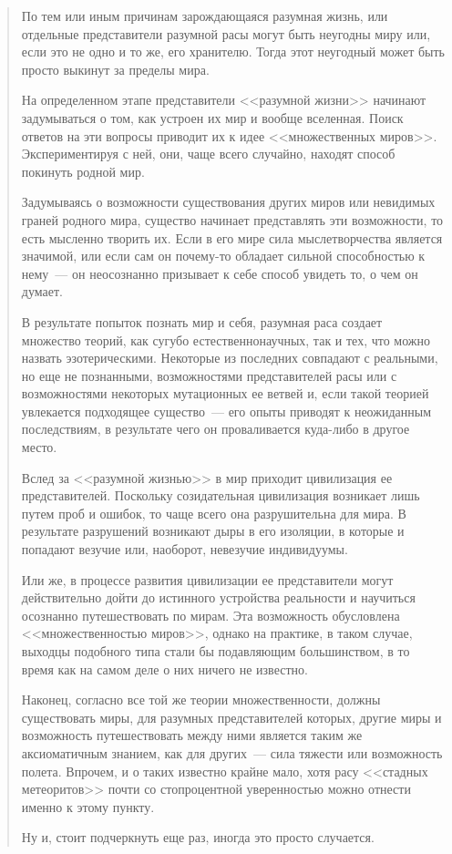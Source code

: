 \begin{quote}
По тем или иным причинам зарождающаяся разумная жизнь, или отдельные 
представители разумной расы могут быть неугодны миру или, если это не одно и то 
же, его хранителю. Тогда этот неугодный может быть просто выкинут за пределы 
мира.

На определенном этапе представители <<разумной жизни>> начинают задумываться о 
том, как устроен их мир и вообще вселенная. Поиск ответов на эти вопросы 
приводит их к идее <<множественных миров>>. Экспериментируя с ней, они, чаще 
всего 
случайно, находят способ покинуть родной мир.

Задумываясь о возможности существования других миров или невидимых граней 
родного мира, существо начинает представлять эти возможности, то есть мысленно 
творить их. Если в его мире сила мыслетворчества является значимой, или если 
сам 
он почему-то обладает сильной способностью к нему~--- он неосознанно призывает 
к 
себе способ увидеть то, о чем он думает.

В результате попыток познать мир и себя, разумная раса создает множество 
теорий, 
как сугубо естественнонаучных, так и тех, что можно назвать эзотерическими. 
Некоторые из последних совпадают с реальными, но еще не познанными, 
возможностями представителей расы или с возможностями некоторых мутационных ее 
ветвей и, если такой теорией увлекается подходящее существо~--- его опыты 
приводят 
к неожиданным последствиям, в результате чего он проваливается куда-либо в 
другое место.

Вслед за <<разумной жизнью>> в мир приходит цивилизация ее представителей. 
Поскольку созидательная цивилизация возникает лишь путем проб и ошибок, то чаще 
всего она разрушительна для мира. В результате разрушений возникают дыры в его 
изоляции, в которые и попадают везучие или, наоборот, невезучие индивидуумы.

Или же, в процессе развития цивилизации ее представители могут действительно 
дойти до истинного устройства реальности и научиться осознанно путешествовать 
по 
мирам. Эта возможность обусловлена <<множественностью миров>>, однако на 
практике, 
в таком случае, выходцы подобного типа стали бы подавляющим большинством, в то 
время как на самом деле о них ничего не известно.

Наконец, согласно все той же теории множественности, должны существовать миры, 
для разумных представителей которых, другие миры и возможность путешествовать 
между ними является таким же аксиоматичным знанием, как для других~--- сила 
тяжести или возможность полета. Впрочем, и о таких известно крайне мало, хотя 
расу <<стадных метеоритов>> почти со стопроцентной уверенностью можно отнести 
именно к этому пункту.

Ну и, стоит подчеркнуть еще раз, иногда это просто случается.
\end{quote}

